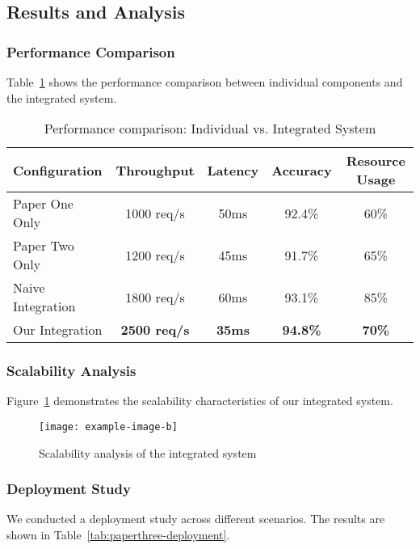 \subsection{Results and Analysis}

\subsubsection{Performance Comparison}

Table~\ref{tab:paperthree-performance} shows the performance comparison between individual components and the integrated system.

\begin{table}[!htb]
\centering
\caption{Performance comparison: Individual vs. Integrated System}
\label{tab:paperthree-performance}
\begin{tabular}{@{}lcccc@{}}
\toprule
Configuration & Throughput & Latency & Accuracy & Resource Usage \\
\midrule
Paper One Only & 1000 req/s & 50ms & 92.4\% & 60\% \\
Paper Two Only & 1200 req/s & 45ms & 91.7\% & 65\% \\
Naive Integration & 1800 req/s & 60ms & 93.1\% & 85\% \\
Our Integration & \textbf{2500 req/s} & \textbf{35ms} & \textbf{94.8\%} & \textbf{70\%} \\
\bottomrule
\end{tabular}
\end{table}

\subsubsection{Scalability Analysis}

Figure~\ref{fig:paperthree-scalability} demonstrates the scalability characteristics of our integrated system.

\begin{figure}[!htb]
    \centering
    \texttt{[image: example-image-b]}
    \caption{Scalability analysis of the integrated system}
    \label{fig:paperthree-scalability}
\end{figure}

\subsubsection{Deployment Study}

We conducted a deployment study across different scenarios. The results are shown in Table~\ref{tab:paperthree-deployment}.


